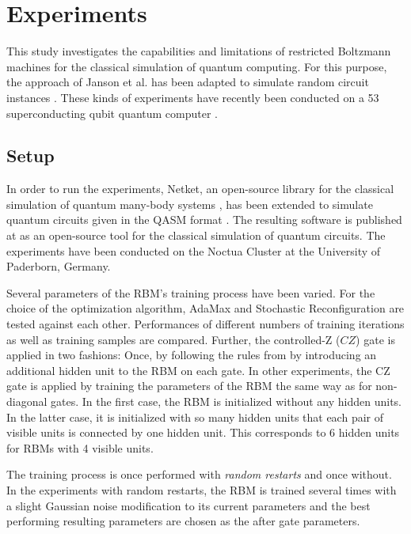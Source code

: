\chapter{Experiments}
\label{sec:experiments}

This study investigates the capabilities and limitations of restricted Boltzmann machines
for the classical simulation of quantum computing. For this purpose, the approach of Janson 
et al. \cite{jnsson2018neuralnetwork} has been adapted to simulate random circuit instances \cite{Boixo2018supremacy}.
These kinds of experiments have recently been conducted on a 53 superconducting qubit quantum computer \cite{martines2019supremacy}.

\section{Setup}

In order to run the experiments, Netket, an open-source library for the classical simulation of quantum 
many-body systems \cite{netket2019}, has been extended to simulate quantum circuits given in the QASM format \cite{cross2017open}. The resulting 
software is published at \cite{} as an open-source tool for the classical simulation 
of quantum circuits. The experiments have been conducted on the Noctua Cluster at the University of Paderborn, Germany.

Several parameters of the RBM's training process have been varied. For the choice of the optimization algorithm, AdaMax and 
Stochastic Reconfiguration are tested against each other. Performances of different numbers of training iterations 
as well as training samples are compared. Further, the controlled-Z ($CZ$) gate is applied in two fashions: Once, 
by following the rules from \cite{jnsson2018neuralnetwork} by introducing an additional hidden unit to the RBM on each gate. In other 
experiments, the CZ gate is applied by training the parameters of the RBM the same way as for 
non-diagonal gates. In the first case, the RBM is initialized without any hidden units. In the latter 
case, it is initialized with so many hidden units that each pair of visible units is connected 
by one hidden unit. This corresponds to 6 hidden units for RBMs with 4 visible units.

The training process is once performed with \textit{random restarts} and once without. 
In the experiments with random restarts, the RBM is trained several times with a slight Gaussian noise modification to its 
current parameters and the best performing resulting parameters are chosen as the after gate parameters. 


